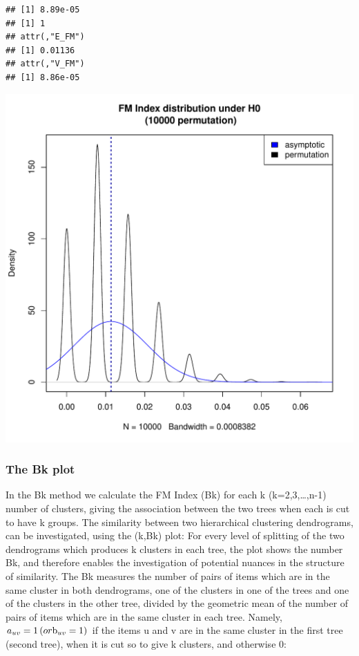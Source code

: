 \documentclass[shortnames,nojss,article]{jss}\usepackage[]{graphicx}\usepackage[]{color}
\makeatletter
\def\maxwidth{ %
  \ifdim\Gin@nat@width>\linewidth
    \linewidth
  \else
    \Gin@nat@width
  \fi
}
\newenvironment{kframe}{%
 \def\at@end@of@kframe{}%
 \ifinner\ifhmode%
  \def\at@end@of@kframe{\end{minipage}}%
  \begin{minipage}{\columnwidth}%
 \fi\fi%
 \def\FrameCommand##1{\hskip\@totalleftmargin \hskip-\fboxsep
 \colorbox{shadecolor}{##1}\hskip-\fboxsep
     \hskip-\linewidth \hskip-\@totalleftmargin \hskip\columnwidth}%
 \MakeFramed {\advance\hsize-\width
   \@totalleftmargin\z@ \linewidth\hsize
   \@setminipage}}%
 {\par\unskip\endMakeFramed%
 \at@end@of@kframe}
\newenvironment{knitrout}{}{} %
\makeatother
\begin{document}
\begin{knitrout}
\color{fgcolor}\begin{kframe}
\begin{verbatim}
## [1] 8.89e-05
## [1] 1
## attr(,"E_FM")
## [1] 0.01136
## attr(,"V_FM")
## [1] 8.86e-05
\end{verbatim}
\end{kframe}

{\centering \includegraphics[width=\maxwidth]{figure/FM_permutation_example_3} 

}



\end{knitrout}


\subsubsection{The Bk plot}


In the Bk method we calculate the FM Index (Bk) for each k (k=2,3,…,n-1) number of clusters, giving the association between the two trees when each is cut to have k groups. The similarity between two hierarchical clustering dendrograms, can be investigated, using the (k,Bk) plot: For every level of splitting of the two dendrograms which produces k clusters in each tree, the plot shows the number Bk, and therefore enables the investigation of potential nuances in the structure of similarity. The Bk measures the number of pairs of items which are in the same cluster in both dendrograms, one of the clusters in one of the trees and one of the clusters in the other tree, divided by the geometric mean of the number of pairs of items which are in the same cluster in each tree. Namely, ${a_{uv}} = 1\left( {or{\rm{ }}{{\rm{b}}_{uv}} = 1} \right)$ if the items u and v are in the same cluster in the first tree (second tree), when it is cut so to give k clusters, and otherwise 0:
\end{document}
